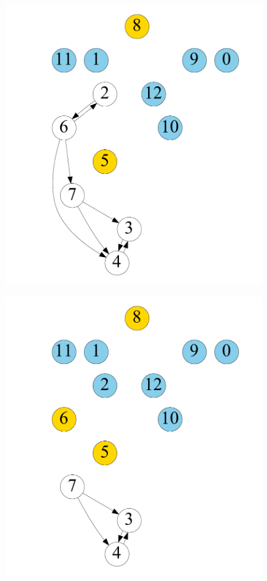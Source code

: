 \begin{figure}[t]
\begin{minipage}[b]{0.19\linewidth}
	\end{minipage}
	\begin{minipage}[b]{0.19\linewidth}
		\centering
		{\includegraphics[width=\textwidth]{./alg_fig/simple-g4}}
	\end{minipage}
	\begin{minipage}[b]{0.19\linewidth}
		\centering
		{\includegraphics[width=\textwidth]{./alg_fig/simple-g6}}

\end{minipage}
\end{figure}
